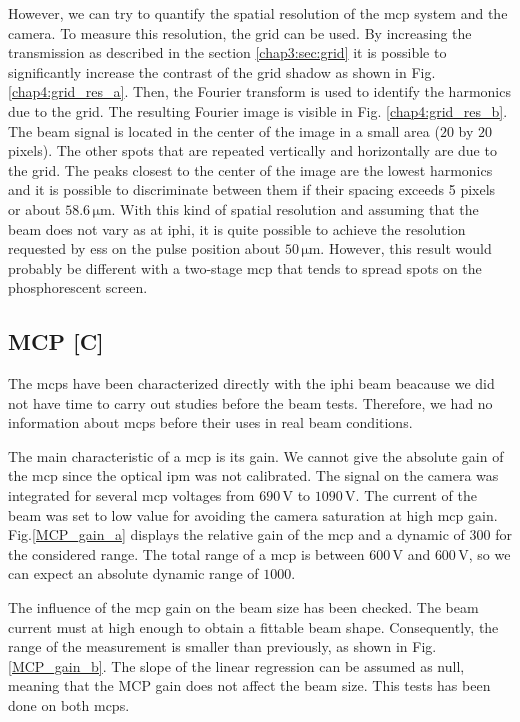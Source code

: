 \begin{refsection}
  However, we can try to quantify the spatial resolution of the \acrshort{mcp} system and the camera.
  To measure this resolution, the grid can be used. By increasing the transmission as described in the section \ref{chap3:sec:grid} it is possible to significantly increase the contrast of the grid shadow as shown in Fig. \ref{chap4:grid_res_a}. Then, the Fourier transform is used to identify the harmonics due to the grid. The resulting Fourier image is visible in Fig. \ref{chap4:grid_res_b}. The beam signal is located in the center of the image in a small area ($20$ by $20$ pixels). The other spots that are repeated vertically and horizontally are due to the grid. The peaks closest to the center of the image are the lowest harmonics and it is possible to discriminate between them if their spacing exceeds 5 pixels or about $58.6\,\mathrm{\mu m}$. With this kind of spatial resolution and assuming that the beam does not vary as at \acrshort{iphi}, it is quite possible to achieve the resolution requested by \acrshort{ess} on the pulse position about $50\,\mathrm{\mu m}$. However, this result would probably be different with a two-stage \acrshort{mcp} that tends to spread spots on the phosphorescent screen.

  

  \subsection{MCP [C]}
  The \acrshort{mcp}s have been characterized directly with the \acrshort{iphi} beam beacause we did not have time to carry out studies before the beam tests. Therefore, we had no information about \acrshort{mcp}s before their uses in real beam conditions.

  The main characteristic of a \acrshort{mcp} is its gain. We cannot give the absolute gain of the \acrshort{mcp} since the optical \acrshort{ipm} was not calibrated. The signal on the camera was integrated for several \acrshort{mcp} voltages from $690\,\mathrm{V}$ to $1090\,\mathrm{V}$. The current of the beam was set to low value for avoiding the camera saturation at high \acrshort{mcp} gain. Fig.\ref{MCP_gain_a} displays the relative gain of the \acrshort{mcp} and a dynamic of $300$ for the considered range. The total range of a \acrshort{mcp} is between $600\,\mathrm{V}$ and $600\,\mathrm{V}$, so we can expect an absolute dynamic range of $1000$.

  The influence of the \acrshort{mcp} gain on the beam size has been checked. The beam current must at high enough to obtain a fittable beam shape. Consequently, the range of the measurement is smaller than previously, as shown in Fig. \ref{MCP_gain_b}. The slope of the linear regression can be assumed as null, meaning that the MCP gain does not affect the beam size. This tests has been done on both \acrshort{mcp}s.


\end{refsection}
